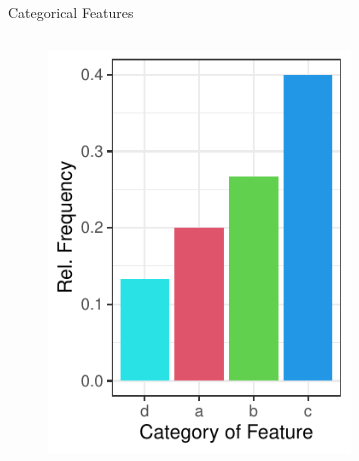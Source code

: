 \documentclass[11pt,compress,t,notes=noshow, xcolor=table]{beamer}
\begin{document}
\begin{frame}[noframenumbering]{Categorical Features}
\begin{columns}
\begin{column}{0.33\textwidth}
\begin{figure}
  \includegraphics[width=0.8\textwidth]{figure/categoryplot-binary2.pdf} 
  \end{figure}
  \end{column}
  \begin{column}{0.33\textwidth}
  \end{column}
  \end{columns}

\end{frame}
\end{document}
